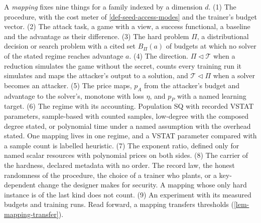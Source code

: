 \begin{definition}
A \emph{mapping} fixes nine things for a family indexed by a dimension $d$. (1) The
procedure, with the cost meter of \cref{def-seed-access-modes} and the trainer's budget
vector. (2) The attack task, a game with a view, a success functional, a baseline and
the advantage as their difference. (3) The hard problem $\Pi$, a distributional decision
or search problem with a cited set $B_\Pi(a)$ of budgets at which no solver of the
stated regime reaches advantage $a$. (4) The direction. $\Pi\lhd\mathcal T$ when a
reduction simulates the game without the secret, counts every training run it
simulates and maps the attacker's output to a solution, and $\mathcal T\lhd\Pi$ when a
solver becomes an attacker. (5) The price maps, $p_A$ from the attacker's budget and
advantage to the solver's, monotone with loss $\eta$, and $p_P$ with a named learning
target. (6) The regime with its accounting. Population SQ with recorded VSTAT
parameters, sample-based with counted samples, low-degree with the composed degree
stated, or polynomial time under a named assumption with the overhead stated. One
mapping lives in one regime, and a VSTAT parameter compared with a sample count is
labelled heuristic. (7) The exponent ratio, defined only for named scalar resources
with polynomial prices on both sides. (8) The carrier of the hardness, declared
metadata with no order. The record law, the honest randomness of the procedure, the
choice of a trainer who plants, or a key-dependent change the designer makes for
security. A mapping whose only hard instance is of the last kind does not count. (9) An
experiment with its measured budgets and training runs. Read forward, a mapping
transfers thresholds (\cref{lem-mapping-transfer}).
\end{definition}

